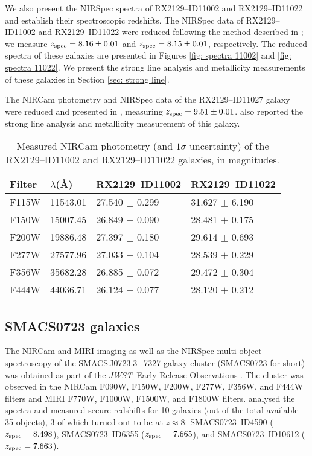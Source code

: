 \documentclass[twocolumn]{aastex631}
\newcommand{\jwst}{{\em JWST}}
\begin{document}
We also present the NIRSpec spectra of RX2129--ID11002 and RX2129--ID11022 and establish their spectroscopic redshifts. The NIRSpec data of RX2129--ID11002 and RX2129--ID11022 were reduced following the method described in \cite{williams+2022}; we measure $z_{\textnormal{\scriptsize spec}} = 8.16 \pm 0.01$ and $z_{\textnormal{\scriptsize spec}} = 8.15 \pm 0.01$, respectively. The reduced spectra of these galaxies are presented in Figures \ref{fig: spectra 11002} and \ref{fig: spectra 11022}. We present the strong line analysis and metallicity measurements of these galaxies in Section \ref{sec: strong line}.

The NIRCam photometry and NIRSpec data of the RX2129--ID11027 galaxy were reduced and presented in \cite{williams+2022}, measuring $z_{\textnormal{\scriptsize spec}} = 9.51 \pm 0.01$. \cite{williams+2022} also reported the strong line analysis and metallicity measurement of this galaxy. 

\begin{table}
\centering
\begin{tabular}{ |l|l|l|l| } 
 \hline
Filter & $\lambda$(\AA) & \footnotesize{RX2129--ID11002} & \footnotesize{RX2129--ID11022} \\ 
\hline\hline
F115W & 11543.01 & 27.540 $\pm$ 0.299 & 31.627 $\pm$ 6.190\\ 
F150W & 15007.45 & 26.849 $\pm$ 0.090 & 28.481 $\pm$ 0.175\\ 
F200W & 19886.48 & 27.397 $\pm$ 0.180 & 29.614 $\pm$ 0.693\\ 
F277W & 27577.96 & 27.033 $\pm$ 0.104 & 28.539 $\pm$ 0.229\\ 
F356W & 35682.28 & 26.885 $\pm$ 0.072 & 29.472 $\pm$ 0.304\\ 
F444W & 44036.71 & 26.124 $\pm$ 0.077 & 28.120 $\pm$ 0.212\\ 
 \hline
\end{tabular}
\caption{Measured NIRCam photometry (and $1\sigma$ uncertainty) of the RX2129--ID11002 and RX2129--ID11022 galaxies, in magnitudes.}
\label{table: photometry}
\end{table}

\subsection{SMACS0723 galaxies}

The NIRCam and MIRI imaging as well as the NIRSpec multi-object spectroscopy of the SMACS\,J0723.3$-$7327 galaxy cluster (SMACS0723 for short) was obtained as part of the \jwst\ Early Release Observations \citep{ERO}. The cluster was observed in the NIRCam F090W, F150W, F200W, F277W, F356W, and F444W filters and MIRI F770W, F1000W, F1500W, and F1800W filters. \cite{carnall+2022} analysed the spectra and measured secure redshifts for 10 galaxies (out of the total available 35 objects), 3 of which turned out to be at $z \approx 8$: SMACS0723--ID4590 ($z_{\textnormal{\scriptsize spec}} = 8.498$), SMACS0723--ID6355 ($z_{\textnormal{\scriptsize spec}} = 7.665$), and SMACS0723--ID10612 ($z_{\textnormal{\scriptsize spec}} = 7.663$).
\end{document}
